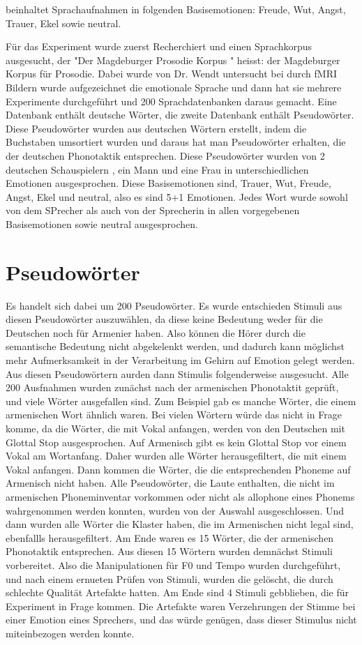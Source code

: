 \documentclass[11pt,a4paper,headsepline,twoside,toc=bibliography]{scrreprt}
\begin{document}
beinhaltet Sprachaufnahmen in folgenden Basisemotionen: Freude, Wut, Angst, Trauer, Ekel sowie neutral. 

Für das Experiment wurde zuerst Recherchiert und einen Sprachkorpus ausgesucht, der "Der Magdeburger Prosodie Korpus " heisst: der Magdeburger Korpus für Prosodie. Dabei wurde von Dr. Wendt untersucht bei durch fMRI Bildern wurde aufgezeichnet die emotionale Sprache und dann hat sie mehrere Experimente durchgeführt und 200 Sprachdatenbanken daraus gemacht. Eine Datenbank enthält deutsche Wörter, die zweite Datenbank enthält Pseudowörter. Diese Pseudowörter wurden aus deutschen Wörtern erstellt, indem die Buchstaben umsortiert wurden und daraus hat man Pseudowörter erhalten, die der deutschen Phonotaktik entsprechen. Diese Pseudowörter wurden von 2 deutschen Schauspielern , ein Mann und eine Frau in unterschiedlichen Emotionen ausgesprochen. Diese Basisemotionen sind, Trauer, Wut, Freude, Angst, Ekel und neutral, also es sind 5+1 Emotionen. Jedes Wort wurde sowohl von dem SPrecher als auch von der Sprecherin in allen vorgegebenen Basisemotionen sowie neutral ausgesprochen.


\section{Pseudowörter}

Es handelt sich dabei um 200 Pseudowörter. Es wurde entschieden Stimuli aus diesen Pseudowörter auszuwählen, da diese keine Bedeutung weder für die Deutschen noch für Armenier haben. Also können die Hörer durch die semantische Bedeutung nicht abgekelenkt werden, und dadurch kann möglichst mehr Aufmerksamkeit in der Verarbeitung im Gehirn auf Emotion gelegt werden. Aus diesen Pseudowörtern aurden dann Stimulis folgenderweise ausgesucht. Alle 200 Ausfnahmen wurden zunächst nach der armenischen Phonotaktit geprüft, und viele Wörter ausgefallen sind. Zum Beispiel gab es manche Wörter, die einem armenischen Wort ähnlich waren.  Bei vielen Wörtern würde das nicht in Frage komme, da die Wörter, die mit Vokal anfangen, werden von den Deutschen mit Glottal Stop ausgesprochen. Auf Armenisch gibt es kein Glottal Stop vor einem Vokal am Wortanfang. Daher wurden alle Wörter herausgefiltert, die mit einem Vokal anfangen. Dann kommen die Wörter, die die entsprechenden Phoneme auf Armenisch nicht haben. Alle Pseudowörter, die Laute enthalten, die nicht im armenischen Phoneminventar vorkommen oder nicht als allophone eines Phonems wahrgenommen werden konnten, wurden von der Auswahl ausgeschlossen. Und dann wurden alle Wörter die Klaster haben, die im Armenischen nicht legal sind, ebenfallls herausgefiltert. Am Ende waren es 15 Wörter, die der armenischen Phonotaktik entsprechen. Aus diesen 15 Wörtern wurden demnächst Stimuli vorbereitet. Also die Manipulationen für F0 und Tempo wurden durchgeführt, und nach einem ernueten Prüfen von Stimuli, wurden die gelöscht, die durch schlechte Qualität Artefakte hatten. Am Ende sind 4 Stimuli gebblieben, die für Experiment in Frage kommen. Die Artefakte waren Verzehrungen der Stimme bei einer Emotion eines Sprechers, und das würde genügen, dass dieser Stimulus nicht miteinbezogen werden konnte.
\end{document}
